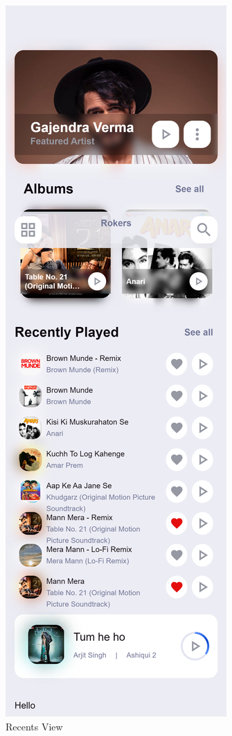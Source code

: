 \begin{figure}[H]
  \caption{Recents View}
  \includegraphics[scale=.2]{./screenshot3.png}

\end{figure}

\pagebreak


